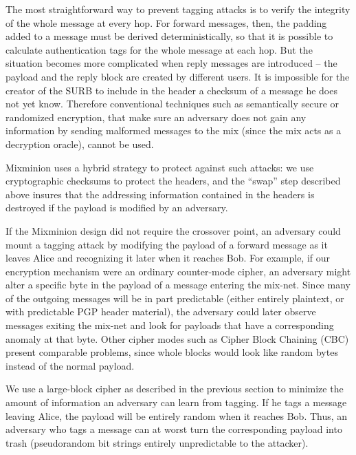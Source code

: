 \documentclass[times,10pt,twocolumn]{article}
\begin{document}
The most straightforward way to prevent tagging attacks is to
verify the integrity of the whole message at every hop.  For forward messages,
then, the padding added to a message must be derived deterministically,
so that it is possible to calculate
authentication tags for the whole message at each hop.  But
the situation becomes more complicated when reply messages are
introduced -- the payload and the reply block are
created by different users. It is impossible for the creator
of the SURB to include in the header a checksum of a message he
does not yet know. Therefore conventional techniques 
such as semantically secure or randomized encryption, that
make sure an adversary does not gain any information by sending
malformed messages to the mix (since the mix acts as a decryption oracle),
cannot be used.

Mixminion uses a hybrid strategy to protect against such attacks: we use
cryptographic checksums to protect the headers, and the ``swap'' step
described above insures that the addressing information contained in the
headers is destroyed if the payload is modified by an adversary.

If the Mixminion design did not require
the crossover point, an adversary could mount a tagging
attack by modifying the payload of a forward message as
it leaves Alice and recognizing it later when it reaches Bob.
For example, if our encryption mechanism were an ordinary
counter-mode cipher, an adversary might alter a specific byte in the payload of
a message entering the mix-net. Since many of the outgoing messages
will be in part predictable (either entirely plaintext, or with
predictable PGP header material), the adversary could later observe
messages exiting the mix-net and look for payloads that have a
corresponding anomaly at that byte. Other cipher modes such as
Cipher Block Chaining (CBC) present comparable problems, since whole
blocks would look like random bytes instead of the normal payload.

We use a large-block cipher as described in the previous section to
minimize the amount of information an adversary can learn from tagging.
If he tags a message
leaving Alice, the payload will be entirely random when it reaches
Bob.  Thus, an adversary who tags a message can at worst turn the
corresponding payload into trash (pseudorandom bit strings entirely
unpredictable to the attacker).

\end{document}
